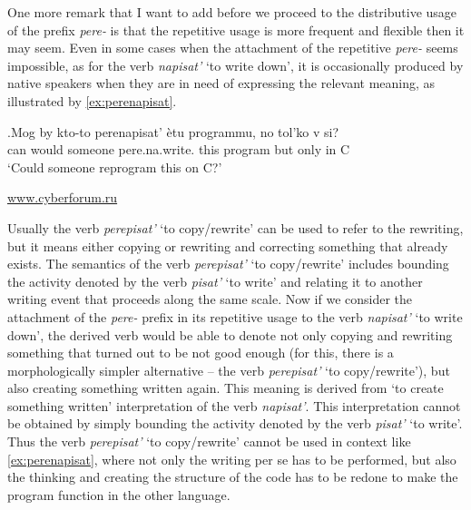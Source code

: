 One more remark that I want to add before we proceed to the distributive usage of the prefix \textit{pere-} is that the repetitive usage is more frequent and flexible then it may seem. Even in some cases when the attachment of the repetitive \textit{pere-} seems impossible, as for the verb \textit{napisat'} `to write down', it is occasionally produced by native speakers when they are in need of expressing the relevant meaning, as illustrated by \ref{ex:perenapisat}. 

\exg.\label{ex:perenapisat}Mog by kto-to perenapisat' \`{e}tu programmu, no tol'ko v si?\\
can would someone pere.na.write. this program but only in C\\
\vspace{0.5em}
`Could someone reprogram this on C?'
\begin{flushright}
\vspace{-0.5em}
\url{www.cyberforum.ru}
\end{flushright}

Usually the verb \textit{perepisat'} `to copy/rewrite' can be used to refer to the rewriting, but it means either copying or rewriting and correcting something that already exists. The semantics of the verb \textit{perepisat'} `to copy/rewrite' includes bounding the activity denoted by the verb \textit{pisat'} `to write' and relating it to another writing event that proceeds along the same scale. Now if we consider the attachment of the \textit{pere-} prefix in its repetitive usage to the verb \textit{napisat'} `to write down', the derived verb would be able to denote not only copying and rewriting something that turned out to be not good enough (for this, there is a morphologically simpler alternative -- the verb \textit{perepisat'} `to copy/rewrite'), but also creating something written again. This meaning is derived from `to create something written' interpretation of the verb \textit{napisat'}. This interpretation cannot be obtained by simply bounding the activity denoted by the verb \textit{pisat'} `to write'. Thus the verb \textit{perepisat'} `to copy/rewrite' cannot be used in context like \ref{ex:perenapisat}, where not only the writing per se has to be performed, but also the thinking and creating the structure of the code has to be redone to make the program function in the other language.

